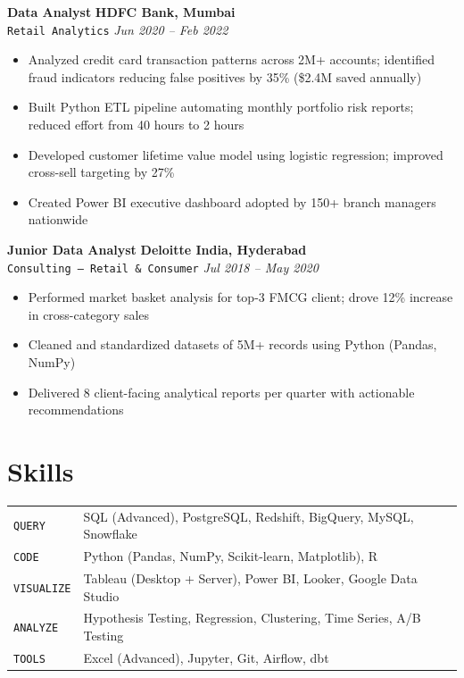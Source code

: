 \documentclass[10pt,a4paper]{article}
\begin{document}
\textbf{Data Analyst} \hfill \textbf{HDFC Bank, Mumbai}\\
{\color{accent}\texttt{Retail Analytics}} \hfill \textit{Jun 2020 -- Feb 2022}
\begin{itemize}
  \item Analyzed credit card transaction patterns across 2M+ accounts; identified fraud indicators reducing false positives by 35\% (\$2.4M saved annually)
  \item Built Python ETL pipeline automating monthly portfolio risk reports; reduced effort from 40 hours to 2 hours
  \item Developed customer lifetime value model using logistic regression; improved cross-sell targeting by 27\%
  \item Created Power BI executive dashboard adopted by 150+ branch managers nationwide
\end{itemize}

\textbf{Junior Data Analyst} \hfill \textbf{Deloitte India, Hyderabad}\\
{\color{accent}\texttt{Consulting -- Retail \& Consumer}} \hfill \textit{Jul 2018 -- May 2020}
\begin{itemize}
  \item Performed market basket analysis for top-3 FMCG client; drove 12\% increase in cross-category sales
  \item Cleaned and standardized datasets of 5M+ records using Python (Pandas, NumPy)
  \item Delivered 8 client-facing analytical reports per quarter with actionable recommendations
\end{itemize}

\section{Skills}

\begin{tabularx}{\textwidth}{@{}l X@{}}
\texttt{\color{accent}QUERY} & SQL (Advanced), PostgreSQL, Redshift, BigQuery, MySQL, Snowflake\\
\texttt{\color{accent}CODE} & Python (Pandas, NumPy, Scikit-learn, Matplotlib), R\\
\texttt{\color{accent}VISUALIZE} & Tableau (Desktop + Server), Power BI, Looker, Google Data Studio\\
\texttt{\color{accent}ANALYZE} & Hypothesis Testing, Regression, Clustering, Time Series, A/B Testing\\
\texttt{\color{accent}TOOLS} & Excel (Advanced), Jupyter, Git, Airflow, dbt\\
\end{tabularx}
\end{document}
